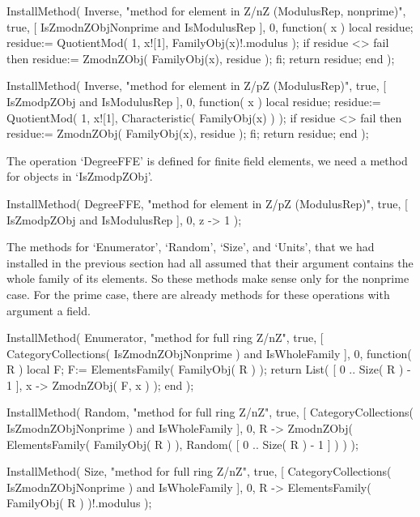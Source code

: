     InstallMethod( Inverse,
        "method for element in Z/nZ (ModulusRep, nonprime)",
        true,
        [ IsZmodnZObjNonprime and IsModulusRep ], 0,
        function( x )
        local residue;
        residue:= QuotientMod( 1, x![1], FamilyObj(x)!.modulus );
        if residue <> fail then
          residue:= ZmodnZObj( FamilyObj(x), residue );
        fi;
        return residue;
        end );

    InstallMethod( Inverse,
        "method for element in Z/pZ (ModulusRep)",
        true,
        [ IsZmodpZObj and IsModulusRep ], 0,
        function( x )
        local residue;
        residue:= QuotientMod( 1, x![1], Characteristic( FamilyObj(x) ) );
        if residue <> fail then
          residue:= ZmodnZObj( FamilyObj(x), residue );
        fi;
        return residue;
        end );
\endtt

The operation `DegreeFFE' is defined for finite field elements,
we need a method for objects in `IsZmodpZObj'.

\begintt
    InstallMethod( DegreeFFE,
        "method for element in Z/pZ (ModulusRep)",
        true,
        [ IsZmodpZObj and IsModulusRep ], 0,
        z -> 1 );
\endtt

The methods for `Enumerator', `Random', `Size', and `Units',
that we had installed in the previous section had all assumed that
their argument contains the whole family of its elements.
So these methods make sense only for the nonprime case.
For the prime case, there are already methods for these operations
with argument a field.

\begintt
    InstallMethod( Enumerator,
        "method for full ring Z/nZ",
        true,
        [ CategoryCollections( IsZmodnZObjNonprime ) and IsWholeFamily ],
        0,
        function( R )
        local F;
        F:= ElementsFamily( FamilyObj( R ) );
        return List( [ 0 .. Size( R ) - 1 ], x -> ZmodnZObj( F, x ) );
        end );

    InstallMethod( Random,
        "method for full ring Z/nZ",
        true,
        [ CategoryCollections( IsZmodnZObjNonprime ) and IsWholeFamily ],
        0,
        R -> ZmodnZObj( ElementsFamily( FamilyObj( R ) ),
                        Random( [ 0 .. Size( R ) - 1 ] ) ) );

    InstallMethod( Size,
        "method for full ring Z/nZ",
        true,
        [ CategoryCollections( IsZmodnZObjNonprime ) and IsWholeFamily ],
        0,
        R -> ElementsFamily( FamilyObj( R ) )!.modulus );

